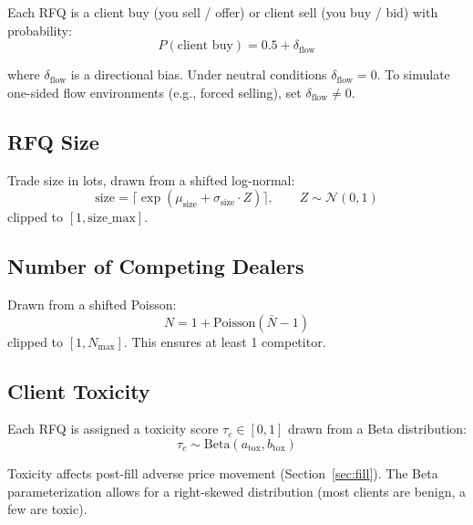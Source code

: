 \documentclass[11pt,a4paper]{article}
\begin{document}
Each RFQ is a client buy (you sell / offer) or client sell (you buy / bid) with probability:
\begin{equation}
P(\text{client buy}) = 0.5 + \delta_{\text{flow}}
\end{equation}

where $\delta_{\text{flow}}$ is a directional bias. Under neutral conditions $\delta_{\text{flow}} = 0$. To simulate one-sided flow environments (e.g., forced selling), set $\delta_{\text{flow}} \neq 0$.

\subsection{RFQ Size}

Trade size in lots, drawn from a shifted log-normal:
\begin{equation}
\text{size} = \lceil \exp(\mu_{\text{size}} + \sigma_{\text{size}} \cdot Z) \rceil, \qquad Z \sim \mathcal{N}(0,1)
\end{equation}
clipped to $[1, \text{size\_max}]$.

\subsection{Number of Competing Dealers}

Drawn from a shifted Poisson:
\begin{equation}
N = 1 + \text{Poisson}(\bar{N} - 1)
\end{equation}
clipped to $[1, N_{\max}]$. This ensures at least 1 competitor.

\subsection{Client Toxicity}

Each RFQ is assigned a toxicity score $\tau_c \in [0, 1]$ drawn from a Beta distribution:
\begin{equation}
\tau_c \sim \text{Beta}(a_{\text{tox}}, b_{\text{tox}})
\end{equation}

Toxicity affects post-fill adverse price movement (Section~\ref{sec:fill}). The Beta parameterization allows for a right-skewed distribution (most clients are benign, a few are toxic).
\end{document}
